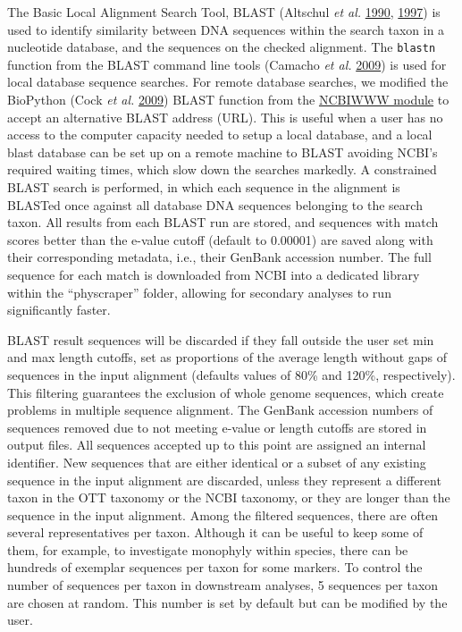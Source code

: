 \documentclass[]{article}
\begin{document}
The Basic Local Alignment Search Tool, BLAST (Altschul \emph{et al.} \protect\hyperlink{ref-altschul1990basic}{1990}, \protect\hyperlink{ref-altschul1997gapped}{1997}) is used to identify
similarity between DNA sequences within the search taxon in a nucleotide
database, and the sequences on the checked alignment.
The \texttt{blastn} function from the BLAST command line tools (Camacho \emph{et al.} \protect\hyperlink{ref-camacho2009blast}{2009}) is used for local database sequence searches.
For remote database searches, we modified the BioPython (Cock \emph{et al.} \protect\hyperlink{ref-cock2009biopython}{2009}) BLAST function from the \href{https://biopython.org/DIST/docs/api/Bio.Blast.NCBIWWW-module.html}{NCBIWWW module} to accept an alternative BLAST address (URL). This is useful when a user has no access to the computer capacity needed to setup a local database, and a local blast database can be set up on a remote machine to BLAST avoiding NCBI's required waiting times, which slow down the searches markedly.
A constrained BLAST search is performed, in which each sequence
in the alignment is BLASTed once against all database DNA sequences belonging to the search
taxon. All results from each BLAST run are stored, and sequences with match scores better than the e-value cutoff (default to 0.00001) are saved
along with their corresponding metadata, i.e., their GenBank accession number.
The full sequence for each match is downloaded from NCBI into a dedicated library within the ``physcraper'' folder, allowing for secondary analyses to run significantly faster.

BLAST result sequences will be discarded if they fall outside the user set min and max length cutoffs, set as proportions of the average length without gaps of sequences in the input alignment (defaults values of 80\% and 120\%, respectively).
This filtering guarantees the exclusion of whole genome sequences, which create problems in multiple sequence alignment.
The GenBank accession numbers of sequences removed due to not meeting e-value or length cutoffs are stored in output files.
All sequences accepted up to this point are assigned an internal identifier.
New sequences that are either identical or a subset of any existing sequence in the input alignment are discarded, unless they represent a different taxon in the OTT taxonomy or the NCBI taxonomy, or they are longer than the sequence in the input alignment.
Among the filtered sequences, there are often several representatives per taxon.
Although it can be useful to keep some of them, for example, to investigate monophyly
within species, there can be hundreds of exemplar sequences per taxon for some markers.
To control the number of sequences per taxon in downstream analyses,
5 sequences per taxon are chosen at random. This number is set by default but can be modified by the user.
\end{document}
